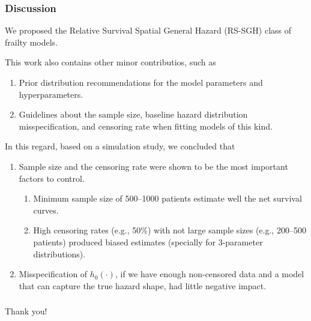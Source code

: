 \documentclass[10pt, aspectratio = 169, handout]{beamer} %
\newcommand{\backupbegin}{
   \newcounter{finalframe}
   \setcounter{finalframe}{\value{framenumber}}
}
\newcommand{\backupend}{
   \setcounter{framenumber}{\value{finalframe}}
}
\begin{document}
    \begin{frame}[t]
		\frametitle{Discussion}
		\justifying

            We proposed the \textcolor{titles}{Relative Survival Spatial General Hazard (RS-SGH)} class of frailty models.

            \pause
            \vspace{5pt}

            This work also contains other minor contributios, such as
            \begin{enumerate} \justifying
                \item Prior distribution recommendations for the model parameters and hyperparameters.
                \item Guidelines about the sample size, baseline hazard distribution misspecification, and censoring rate when fitting models of this kind.
            \end{enumerate}

            \vspace{5pt}
            \pause
            
            In this regard, based on a  simulation study, we concluded that
            \begin{enumerate} \justifying
                \item Sample size and the censoring rate were shown to be the most important factors to control.
                \begin{enumerate} \justifying
                    \item Minimum sample size of 500--1000 patients estimate well the net survival curves.
                    \item High censoring rates (e.g., 50\%) with not large sample sizes (e.g., 200--500 patients) produced biased estimates (specially for 3-parameter distributions).
                \end{enumerate} \pause
                \item Misspecification of $h_0(\cdot)$, if we have enough non-censored data and a model that can capture the true hazard shape, had little negative impact.
            \end{enumerate}
            

            \pause
            \vspace{5pt}

            
	\end{frame}


\backupbegin
    \begin{frame}[t]
		\frametitle{}
		\justifying
  
        \vspace*{\fill} 
        \centering 
        \vspace{24pt}
        \LARGE \textcolor{titles}{Thank you!}
        \vspace*{\fill}
	\end{frame}
\backupend
 
 
\end{document}
